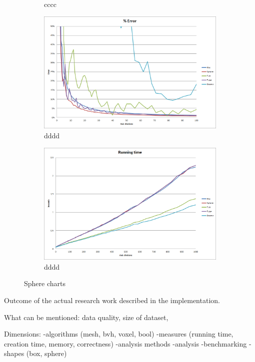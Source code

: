 \documentclass[11pt,twoside,a4paper]{report}
\begin{document}
\begin{figure}[h]
\begin{subfigure}[h]{0.49\textwidth}
	\caption{cccc} \label{fig:gull} \end{subfigure}
    \begin{subfigure}[h]{0.49\textwidth}
	\includegraphics[width=\textwidth]{images/chart_voxel_error_zoomed}
    \caption{dddd} \label{fig:tiger} \end{subfigure}
    \begin{subfigure}[h]{0.49\textwidth}
	\includegraphics[width=\textwidth]{images/chart_voxel_running_time}
    \caption{dddd} \label{fig:tiger} \end{subfigure}
    \caption{Sphere charts}\label{fig:animals}
\end{figure}

Outcome of the actual research work described in the implementation.

What can be mentioned: data quality, size of dataset, 

Dimensions: 
-algorithms (mesh, bvh, voxel, bool)
-measures (running time, creation time, memory, correctness)
-analysis methods
  -analysis
  -benchmarking
    -shapes (box, sphere)
    
\end{document}
